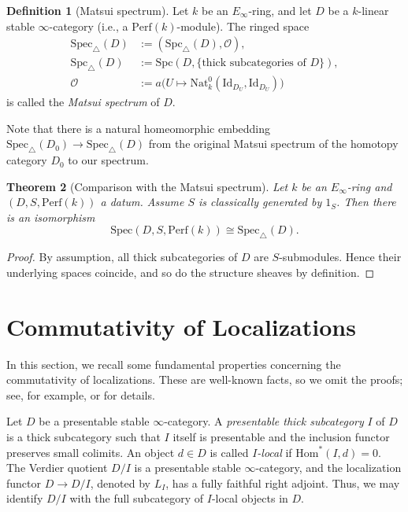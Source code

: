 \documentclass[11pt]{amsart}
\theoremstyle{definition}
\newtheorem{defn}{Definition}[section]
\theoremstyle{plain}
\newtheorem{thm}[defn]{Theorem}
\theoremstyle{remark}
\newcommand{\perf}{\mathrm{Perf}}
\newcommand{\Spec}{\mathrm{Spec}}
\newcommand{\tSpec}{\mathrm{Spec}_{\triangle}}
\newcommand{\Nat}{\mathrm{Nat}}
\newcommand{\sO}{\mathscr{O}}
\newcommand{\Hom}{\mathrm{Hom}}
\newcommand{\Id}{\mathrm{Id}}
\newcommand{\Spc}{\mathrm{Spc}}
\newcommand{\tSpc}{\mathrm{Spc}_{\triangle}}
\numberwithin{equation}{section}
\begin{document}
\begin{defn}[Matsui spectrum]
Let \(k\) be an \(E_\infty\)-ring, and let \(D\) be a \(k\)-linear stable \(\infty\)-category (i.e., a \(\perf(k)\)-module).
The ringed space
\begin{align*}
  \tSpec(D)&:=(\tSpc(D),\sO),\\
  \tSpc(D)&:=\Spc(D,\{\text{thick subcategories of }D\}),\\
  \sO&:=a\bigl(U\mapsto \Nat^0_k(\Id_{D_U},\Id_{D_U})\bigr)
\end{align*}
is called the \emph{Matsui spectrum} of \(D\).
\end{defn}
Note that there is a natural homeomorphic embedding \(\tSpec(D_0)\to \tSpec(D)\) from the original Matsui spectrum of the homotopy category \(D_0\) to our spectrum.

\begin{thm}[Comparison with the Matsui spectrum]\label{thm:comparison_with_the_Matsui_spectrum}
Let \(k\) be an \(E_\infty\)-ring and \((D,S,\perf(k))\) a datum.
Assume \(S\) is classically generated by \(1_S\).
Then there is an isomorphism
\[
\Spec(D,S,\perf(k))\cong \tSpec(D).
\]
\end{thm}
\begin{proof}
By assumption, all thick subcategories of \(D\) are \(S\)-submodules.
Hence their underlying spaces coincide, and so do the structure sheaves by definition.
\end{proof}

\section{Commutativity of Localizations}\label{section:commutativity_of_localizations}
In this section, we recall some fundamental properties concerning the commutativity of localizations.
These are well-known facts, so we omit the proofs; see, for example, \cite{Kr} or \cite[Proposition~10.5]{Sc} for details.

Let \(D\) be a presentable stable \(\infty\)-category.
A \emph{presentable thick subcategory} \(I\) of \(D\) is a thick subcategory such that \(I\) itself is presentable and the inclusion functor preserves small colimits.
An object \(d\in D\) is called \emph{\(I\)-local} if \(\Hom^*(I,d)=0\).
The Verdier quotient \(D/I\) is a presentable stable \(\infty\)-category, and the localization functor \(D \to D/I\), denoted by \(L_I\), has a fully faithful right adjoint.
Thus, we may identify \(D/I\) with the full subcategory of \(I\)-local objects in \(D\).
\end{document}
